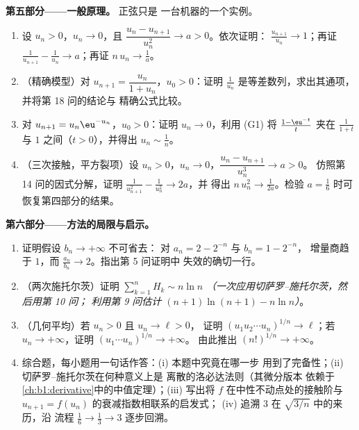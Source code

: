\begin{problem}[{周末问题——切萨罗--施托尔茨定理，
以及 $u_n \sim \sqrt{3/n}$ 的渐近性，对于 $u_{n+1} = \sin
u_n$}]
\medskip
\noindent\textbf{第五部分——一般原理。} 正弦只是
一台机器的一个实例。
\begin{enumerate}[resume]
  \item 设 $u_n > 0$，$u_n \to 0$，且 $\dfrac{u_n -
        u_{n+1}}{u_n^{2}} \to a > 0$。依次证明：
        $\frac{u_{n+1}}{u_n} \to 1$；再证 $\frac{1}{u_{n+1}} -
        \frac{1}{u_n} \to a$；再证 $n\,u_n \to \frac1a$。
  \item （精确模型）对 $u_{n+1} = \dfrac{u_n}{1 + u_n}$，$u_0
        > 0$：证明 $\frac{1}{u_n}$ 是等差数列，求出其通项，
        并将第 18 问的结论与
        精确公式比较。
  \item 对 $u_{n+1} = u_n \eu^{-u_n}$，$u_0 > 0$：证明 $u_n \to
        0$，利用 (G1) 将 $\frac{1 - \eu^{-t}}{t}$ 夹在
        $\frac{1}{1+t}$ 与 $1$ 之间（$t > 0$），并得出 $u_n
        \sim \frac 1n$。
  \item （三次接触，平方裂项）设 $u_n > 0$，$u_n
        \to 0$，$\dfrac{u_n - u_{n+1}}{u_n^{3}} \to a > 0$。
        仿照第 14 问的因式分解，证明
        $\frac{1}{u_{n+1}^2} - \frac{1}{u_n^2} \to 2a$，并
        得出 $n\,u_n^{2} \to \frac{1}{2a}$。检验 $a =
        \frac16$ 时可恢复第四部分的结果。
\end{enumerate}

\medskip
\noindent\textbf{第六部分——方法的局限与启示。}
\begin{enumerate}[resume]
  \item 证明假设 $b_n \to +\infty$ 不可省去：
        对 $a_n = 2 - 2^{-n}$ 与 $b_n = 1 - 2^{-n}$，
        增量商趋于 $1$，而 $\frac{a_n}
        {b_n} \to 2$。指出第 5 问证明中
        失效的确切一行。
  \item （两次施托尔茨）证明 $\sum_{k=1}^{n} H_k \sim n \ln n$
        \emph{（一次应用切萨罗–施托尔茨，然后用第 10 问；
        利用第 9 问估计 $(n+1)\ln(n+1) - n\ln n$）}。
  \item （几何平均）若 $u_n > 0$ 且 $u_n \to \ell > 0$，
        证明 $(u_1 u_2 \cdots u_n)^{1/n} \to \ell$；若 $u_n \to
        +\infty$，证明 $(u_1 \cdots u_n)^{1/n} \to +\infty$。
        由此推出 $(n!)^{1/n} \to +\infty$。
  \item 综合题，每小题用一句话作答：(i) 本题中究竟在哪一步
        用到了完备性；(ii) 切萨罗–施托尔茨在何种意义上是
        离散的洛必达法则（其微分版本
        依赖于
        \cref{ch:b1:derivative}中的中值定理）；(iii) 写出将
        $f$ 在中性不动点处的接触阶与
        $u_{n+1} = f(u_n)$ 的衰减指数相联系的启发式；
        (iv) 追溯 $3$ 在 $\sqrt{3/n}$ 中的来历，沿
        流程 $\frac16 \to \frac13 \to 3$ 逐步回溯。
\end{enumerate}
\end{problem}
